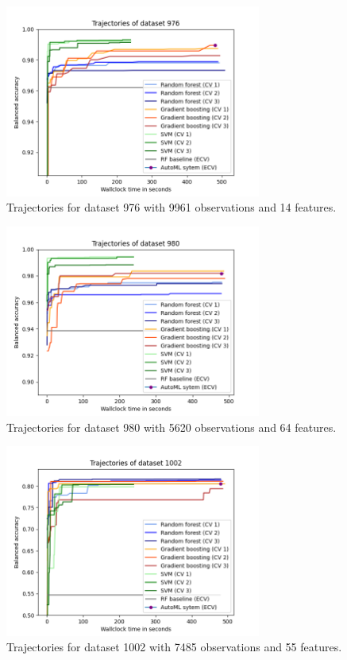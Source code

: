 \documentclass[11pt]{article}
\begin{document}
\begin{figure}[H]
 \centering
  \includegraphics[width=0.75\textwidth]{fig/plot_dataset_976.png}
  \caption{Trajectories for dataset 976 with 9961 observations and 14 features.}
\end{figure}

\begin{figure}[H]
 \centering
  \includegraphics[width=0.75\textwidth]{fig/plot_dataset_980.png}
  \caption{Trajectories for dataset 980 with 5620 observations and 64 features.}
\end{figure}

\begin{figure}[H]
 \centering
  \includegraphics[width=0.75\textwidth]{fig/plot_dataset_1002.png}
  \caption{Trajectories for dataset 1002 with 7485 observations and 55 features.}
\end{figure}
\end{document}
